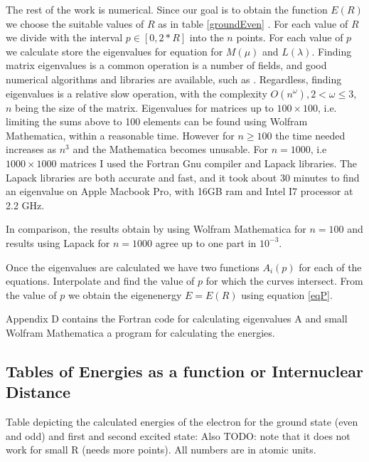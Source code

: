 The rest of the work is numerical. Since our goal is to obtain the function $ E(R) $ we choose the suitable values of $ R $ as in table \ref{groundEven} . For each value of $ R $ we divide with the interval $ p \in [0,2*R] $ into the $ n $ points. For each value of $ p $ we calculate store the eigenvalues for equation for $ M(\mu) $ and $ L(\lambda) $. Finding matrix eigenvalues is a common operation is a number of fields, and good numerical algorithms and libraries are available, such as \cite{Lapack1}.  Regardless, finding eigenvalues is a relative slow operation, with the complexity $ O(n^\omega), 2 < \omega \le 3 $, \cite{Lapack1} $ n $ being the size of the matrix.  Eigenvalues for matrices up to $ 100 \times 100 $, i.e. limiting the sums above to 100 elements can be found using Wolfram Mathematica, within a reasonable time. However for $ n \ge 100 $ the time needed increases as $ n^3 $ \cite{QRDecomposition1} \cite{LinearAlgebra1} and the Mathematica becomes unusable. For $  n = 1000 $, i.e $ 1000 \times 1000  $ matrices I used the Fortran Gnu compiler and Lapack \cite{Lapack1} libraries. The Lapack libraries are both accurate and fast, and it took about 30 minutes to find an eigenvalue on Apple Macbook Pro, with 16GB ram and Intel I7 processor at 2.2 GHz.

In comparison, the results obtain by using Wolfram Mathematica for $ n = 100 $ and results using Lapack for $ n = 1000 $  agree up to one part in $ 10^{-3} $.

Once the eigenvalues are calculated we have two functions $ A_i(p) $ for each of the equations. Interpolate and find the value of $ p $ for which the curves intersect. From the value of $ p $ we obtain the eigenenergy $ E = E(R) $ using equation \eqref{eqP}.

Appendix D contains the Fortran code for calculating eigenvalues A and small Wolfram Mathematica a program for calculating the energies.

\subsection{Tables of Energies as a function or Internuclear Distance}

Table depicting the calculated energies of the electron for the ground state (even and odd) and first and second excited state:  Also TODO: note that it does not work for small R (needs more points). All numbers are in atomic units.

